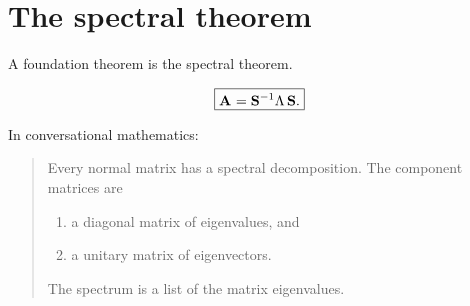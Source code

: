 \chapter{The spectral theorem}

A foundation theorem is the spectral theorem.

\begin{equation}
\boxed{
\textbf{A}^{\mathrm{}} = \mathbf{S}^{-1}\Lambda\,\mathbf{S}.
}
\end{equation}

In conversational mathematics: 
\begin{quote}
Every normal matrix has a spectral decomposition. The component matrices are
\begin{enumerate}
\item a diagonal matrix of eigenvalues, and
\item a unitary matrix of eigenvectors.
\end{enumerate}
The spectrum is a list of the matrix eigenvalues.
 \end{quote}

\endinput